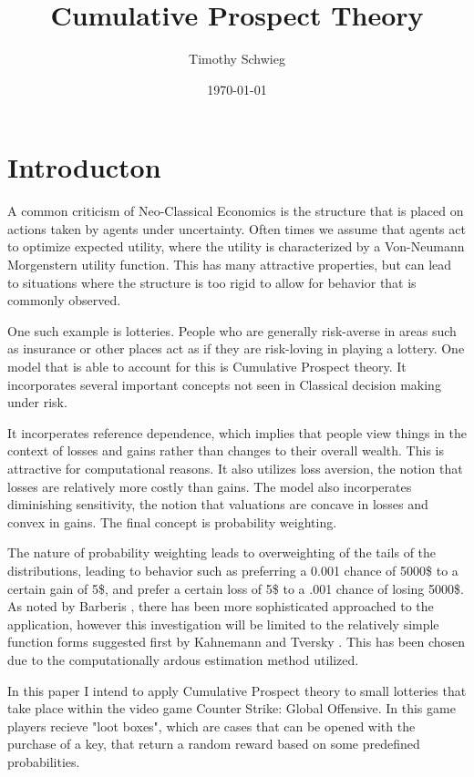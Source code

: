 \documentclass[11pt]{article}
\author{Timothy Schwieg}
\date{\today}
\title{Cumulative Prospect Theory}
\begin{document}
\maketitle


\section{Introducton}
\label{sec-1}
A common criticism of Neo-Classical Economics is the structure that is
placed on actions taken by agents under uncertainty. Often times we
assume that agents act to optimize expected utility, where the utility
is characterized by a Von-Neumann Morgenstern utility function. This
has many attractive properties, but can lead to situations where the
structure is too rigid to allow for behavior that is commonly
observed.

One such example is lotteries. People who are generally risk-averse in
areas such as insurance or other places act as if they are risk-loving
in playing a lottery. One model that is able to account for this is
Cumulative Prospect theory. It incorporates several important concepts
not seen in Classical decision making under risk.

It incorperates reference dependence, which implies that people view
things in the context of losses and gains rather than changes to their
overall wealth. This is attractive for computational reasons. It also
utilizes loss aversion, the notion that losses are relatively more
costly than gains. The model also incorperates diminishing
sensitivity, the notion that valuations are concave in losses and
convex in gains. The final concept is probability weighting.

The nature of probability weighting leads
to overweighting of the tails of the distributions, leading to
behavior such as preferring a 0.001 chance of 5000\$ to a certain gain
of 5\$, and prefer a certain loss of 5\$ to a .001 chance of losing
5000\$. As noted by Barberis \cite{LitReview}, there has been more sophisticated
approached to the application, however this investigation will be
limited to the relatively simple function forms suggested first by
Kahnemann and Tversky \cite{Kahn}. This has been chosen due to the
computationally ardous estimation method utilized. 

In this paper I intend to apply Cumulative Prospect theory to small
lotteries that take place within the video game Counter Strike: Global
Offensive. In this game players recieve "loot boxes", which are cases
that can be opened with the purchase of a key, that return a random
reward based on some predefined probabilities. 
\end{document}
